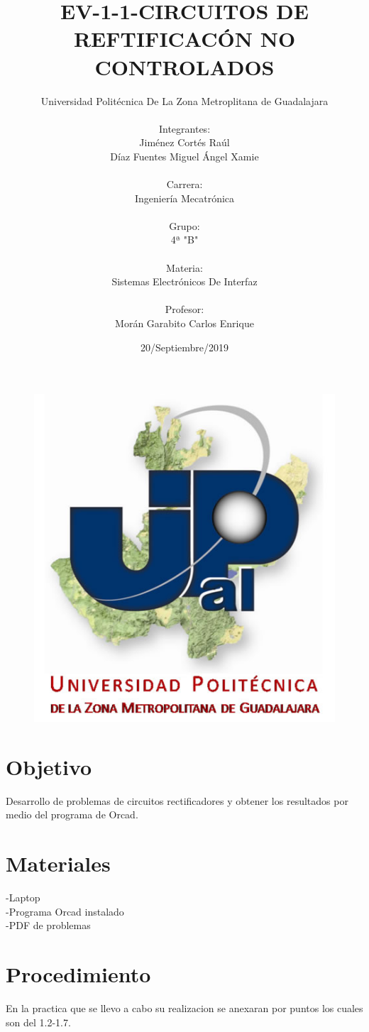 \documentclass[10pt,a4paper]{article}
\author{Universidad Politécnica De La Zona Metroplitana de Guadalajara \\\\ Integrantes:\\ Jiménez Cortés Raúl \\ Díaz Fuentes Miguel Ángel Xamie \\\\ Carrera:\\ Ingeniería Mecatrónica\\\\ Grupo:\\ 4ª "B" \\\\
Materia:\\ Sistemas Electrónicos De Interfaz \\\\ Profesor:\\ Morán Garabito Carlos Enrique}
\title{EV-1-1-CIRCUITOS DE REFTIFICACÓN NO CONTROLADOS}
\date{20/Septiembre/2019}
\begin{document}
\begin{figure}
\centering
\includegraphics[scale=1]{Pa.jpg}
\end{figure}

\maketitle

\newpage
\section{Objetivo}
Desarrollo de problemas de circuitos rectificadores y obtener los resultados por medio del programa de Orcad. 
\section{Materiales}
-Laptop\\ -Programa Orcad instalado\\ -PDF de problemas
\section{Procedimiento}
En la practica que se llevo a cabo su realizacion se anexaran por puntos los cuales son del 1.2-1.7.
\end{document}
